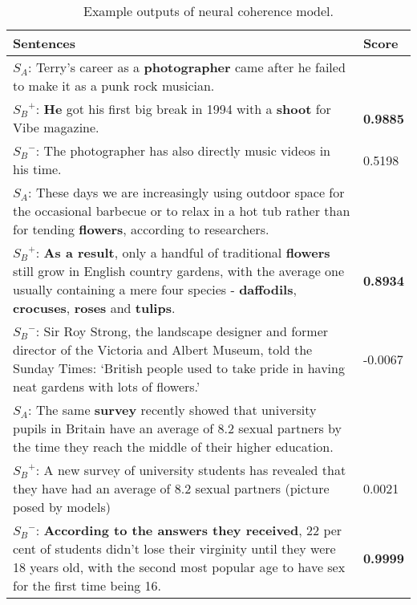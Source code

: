 \documentclass[letterpaper]{article} \usepackage{aaai18}  \usepackage{times}  \usepackage{helvet}  \usepackage{courier}  \usepackage{url}  \usepackage{graphicx}  \usepackage{amssymb}
\begin{document}
\begin{table}[htb]
		\centering
		\caption{Example outputs of neural coherence model.}
		\label{tab:coherence_examples}
		\begin{tabular}{|p{65mm}|p{10mm}|}
			\hline
			 \centering Sentences &  Score \\\hline
			$S_A$: \small{Terry's career as a \textbf{photographer} came after he failed to make it as a punk rock musician.} & \\
			${S_B}^{+}$: \small{\textbf{He} got his first big break in 1994 with a \textbf{shoot} for Vibe magazine.} & \textbf{0.9885} \\
			${S_B}^{-}$: \small{The photographer has also directly music videos in his time.} & 0.5198 \\
			 \hline
			 $S_A$: \small{These days we are increasingly using outdoor space for the occasional barbecue or to relax in a hot tub rather than for tending \textbf{flowers}, according to researchers.} & \\
			 ${S_B}^{+}$: \small{\textbf{As a result}, only a handful of traditional \textbf{flowers} still grow in English country gardens, with the average one usually containing a mere four species - \textbf{daffodils}, \textbf{crocuses}, \textbf{roses} and \textbf{tulips}.} & \textbf{0.8934} \\
			 ${S_B}^{-}$: \small{Sir Roy Strong, the landscape designer and former director of the Victoria and Albert Museum, told the Sunday Times: `British people used to take pride in having neat gardens with lots of flowers.'} & -0.0067 \\
			\hline
			$S_A$: \small{The same \textbf{survey} recently showed that university pupils in Britain have an average of 8.2 sexual partners by the time they reach the middle of their higher education.} & \\
			${S_B}^{+}$: \small{A new survey of university students has revealed that they have had an average of 8.2 sexual partners (picture posed by models)} & 0.0021 \\
			${S_B}^{-}$: \small{\textbf{According to the answers they received}, 22 per cent of students didn't lose their virginity until they were 18 years old, with the second most popular age to have sex for the first time being 16. } & \textbf{0.9999} \\
\hline
		\end{tabular}
	\end{table}
\end{document}
